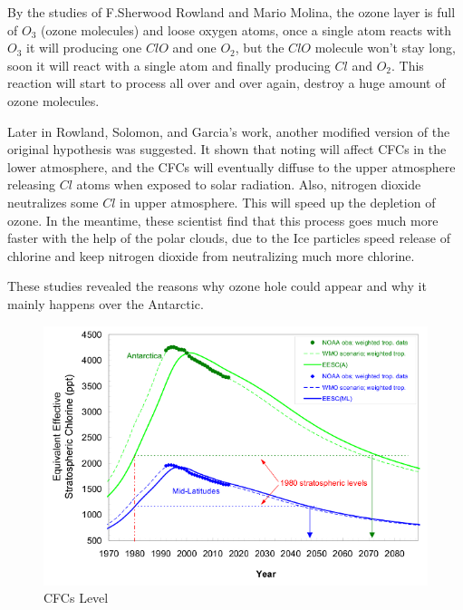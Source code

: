 \documentclass[12pt]{article}
\begin{document}
By the studies of F.Sherwood Rowland and Mario Molina, the ozone layer is full of $O_3$ (ozone molecules) and loose oxygen atoms, once a single atom reacts with $O_3$ it will producing one $ClO$ and one $O_2$, but the $ClO$ molecule won't stay long, soon it will react with a single atom and finally producing $Cl$ and $O_2$. This reaction will start to process all over and over again, destroy a huge amount of ozone molecules.

Later in Rowland, Solomon, and Garcia’s work, another modified version of the original hypothesis was suggested. It shown that noting will affect CFCs in the lower atmosphere, and  the CFCs will eventually diffuse to the upper atmosphere releasing $Cl$ atoms when exposed to solar radiation. Also, nitrogen dioxide neutralizes some $Cl$ in upper atmosphere. This will speed up the depletion of ozone. In the meantime, these scientist find that this process  goes much more faster with the help of the polar clouds, due to the Ice particles speed release of chlorine and keep nitrogen dioxide from neutralizing much more chlorine.

These studies revealed the reasons why ozone hole could appear and why it mainly happens over the Antarctic. \cite{newman2006will} 

\begin{center}
\begin{figure}[htpb]
\centering
\includegraphics[scale=0.8]{cfc}
\caption{CFCs Level\cite{ncep.noaa.gov}}\label{fig:CFCs Level}
\end{figure}
\end{center}
\end{document}
